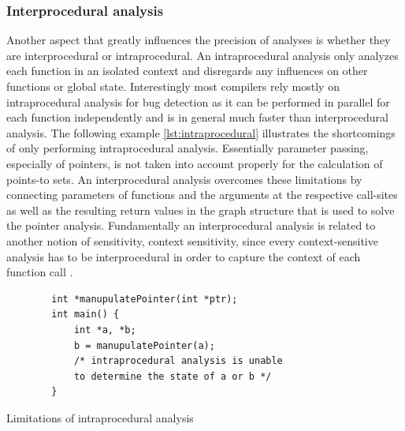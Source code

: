 \subsubsection{Interprocedural analysis}
Another aspect that greatly influences the precision of analyses is whether they are interprocedural or intraprocedural.
An intraprocedural analysis only analyzes each function in an isolated context and disregards any influences on other functions or global state.
Interestingly most compilers rely mostly on intraprocedural analysis for bug detection as it can be performed in parallel for each function independently and is in general much faster than interprocedural analysis.
The following example \autoref{lst:intraprocedural} illustrates the shortcomings of only performing intraprocedural analysis. Essentially parameter passing, especially of pointers, is not taken into account properly for the calculation of points-to sets.
An interprocedural analysis overcomes these limitations by connecting parameters of functions and the arguments at the respective call-sites as well as the resulting return values in the graph structure that is used to solve the pointer analysis.
Fundamentally an interprocedural analysis is related to another notion of sensitivity, context sensitivity, since every context-sensitive analysis has to be interprocedural in order to capture the context of each function call \cite{lin2015alias}.

\begin{listing}
    \begin{verbatim}
        int *manupulatePointer(int *ptr);
        int main() {
            int *a, *b;
            b = manupulatePointer(a);
            /* intraprocedural analysis is unable 
            to determine the state of a or b */
        }
    \end{verbatim}
    \caption{Limitations of intraprocedural analysis}
    \label{lst:intraprocedural}
\end{listing}

